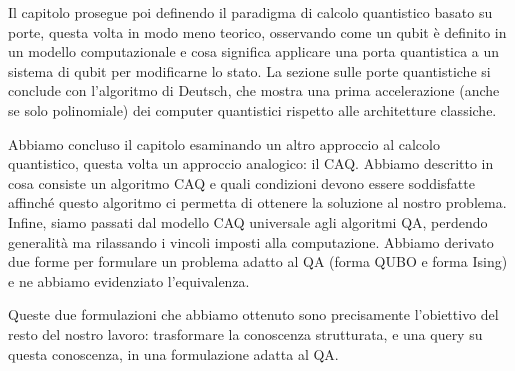 Il capitolo prosegue poi definendo il paradigma di calcolo quantistico basato su porte, questa volta in modo meno teorico, osservando come un qubit è definito in un modello computazionale e cosa significa applicare una porta quantistica a un sistema di qubit per modificarne lo stato. La sezione sulle porte quantistiche si conclude con l'algoritmo di Deutsch, che mostra una prima accelerazione (anche se solo polinomiale) dei computer quantistici rispetto alle architetture classiche.

Abbiamo concluso il capitolo esaminando un altro approccio al calcolo quantistico, questa volta un approccio analogico: il CAQ. Abbiamo descritto in cosa consiste un algoritmo CAQ e quali condizioni devono essere soddisfatte affinché questo algoritmo ci permetta di ottenere la soluzione al nostro problema. Infine, siamo passati dal modello CAQ universale agli algoritmi QA, perdendo generalità ma rilassando i vincoli imposti alla computazione. Abbiamo derivato due forme per formulare un problema adatto al QA (forma QUBO e forma Ising) e ne abbiamo evidenziato l'equivalenza.

Queste due formulazioni che abbiamo ottenuto sono precisamente l'obiettivo del resto del nostro lavoro: trasformare la conoscenza strutturata, e una query su questa conoscenza, in una formulazione adatta al QA.